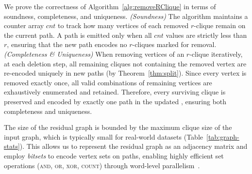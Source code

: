 We prove the correctness of Algorithm~\ref{alg:removeRClique} in terms of soundness, completeness, and uniqueness.
%
\emph{(Soundness)} 
The algorithm maintains a counter array $cnt$ to track how many vertices of each removed $r$-clique remain on the current path.
A path is emitted only when all $cnt$ values are strictly less than $r$, ensuring that the new path encodes no $r$-cliques marked for removal.
%
\emph{(Completeness \& Uniqueness)} 
When removing vertices of an $r$-clique iteratively, at each deletion step, all remaining cliques not containing the removed vertex are re-encoded uniquely in new paths (by Theorem~\ref{thm:split}). 
Since every vertex is removed exactly once, all valid combinations of remaining vertices are exhaustively enumerated and retained. 
Therefore, every surviving clique is preserved and encoded by exactly one path in the updated \cpi, ensuring both completeness and uniqueness.

The size of the residual graph is bounded by the maximum clique size of the input graph, which is typically small for real-world datasets (Table~\ref{tab:graph-stats}). 
This allows us to represent the residual graph as an adjacency matrix and employ \emph{bitsets} to encode vertex sets on paths, enabling highly efficient set operations (\textsc{and}, \textsc{or}, \textsc{xor}, \textsc{count}) through word-level parallelism~\cite{bitsetClique}.





